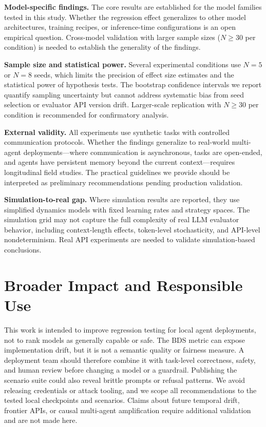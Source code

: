 \documentclass[11pt]{article}
\begin{document}
\textbf{Model-specific findings.} The core results are established for the model families tested in this study. Whether the regression effect generalizes to other model architectures, training recipes, or inference-time configurations is an open empirical question. Cross-model validation with larger sample sizes ($N{\geq}30$ per condition) is needed to establish the generality of the findings.

\textbf{Sample size and statistical power.} Several experimental conditions use $N{=}5$ or $N{=}8$ seeds, which limits the precision of effect size estimates and the statistical power of hypothesis tests. The bootstrap confidence intervals we report quantify sampling uncertainty but cannot address systematic bias from seed selection or evaluator API version drift. Larger-scale replication with $N{\geq}30$ per condition is recommended for confirmatory analysis.

\textbf{External validity.} All experiments use synthetic tasks with controlled communication protocols. Whether the findings generalize to real-world multi-agent deployments—where communication is asynchronous, tasks are open-ended, and agents have persistent memory beyond the current context—requires longitudinal field studies. The practical guidelines we provide should be interpreted as preliminary recommendations pending production validation.

\textbf{Simulation-to-real gap.} Where simulation results are reported, they use simplified dynamics models with fixed learning rates and strategy spaces. The simulation grid may not capture the full complexity of real LLM evaluator behavior, including context-length effects, token-level stochasticity, and API-level nondeterminism. Real API experiments are needed to validate simulation-based conclusions.

\section{Broader Impact and Responsible Use}
\label{sec:broader}

This work is intended to improve regression testing for local agent
deployments, not to rank models as generally capable or safe. The BDS metric
can expose implementation drift, but it is not a semantic quality or fairness
measure. A deployment team should therefore combine it with task-level
correctness, safety, and human review before changing a model or a guardrail.
Publishing the scenario suite could also reveal brittle prompts or refusal
patterns. We avoid releasing credentials or attack tooling, and we scope all
recommendations to the tested local checkpoints and scenarios. Claims about
future temporal drift, frontier APIs, or causal multi-agent amplification
require additional validation and are not made here.
\end{document}
